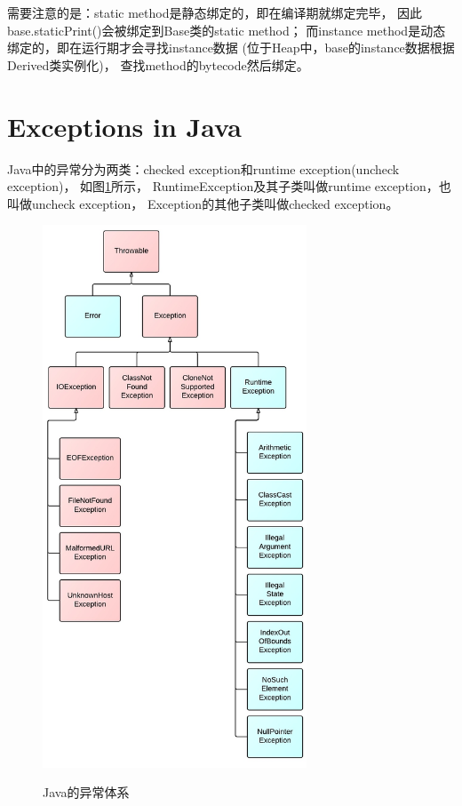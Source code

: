 \documentclass[a4paper,11pt]{article}
\begin{document}
需要注意的是：static method是静态绑定的，即在编译期就绑定完毕，
因此base.staticPrint()会被绑定到Base类的static method；
而instance method是动态绑定的，即在运行期才会寻找instance数据
(位于Heap中，base的instance数据根据Derived类实例化)，
查找method的bytecode然后绑定。


\section[Exceptions in Java]{Exceptions in Java}
Java中的异常分为两类：checked exception和runtime exception(uncheck exception)，
如图\ref{fig:exceptions}所示，
RuntimeException及其子类叫做runtime exception，也叫做uncheck exception，
Exception的其他子类叫做checked exception。

\begin{figure}
  \centering
  \includegraphics[width=0.7\textwidth]{picturedir/JavaExceptions.jpeg}\\
  \caption{Java的异常体系}\label{fig:exceptions}
\end{figure}
\end{document}
